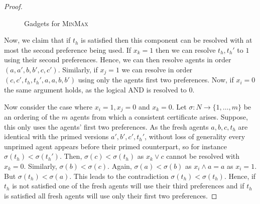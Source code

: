 \documentclass[11pt,a4paper, titlepage]{article}
\theoremstyle{definition}
\begin{document}
\begin{proof}
\begin{figure}
{{
    }}
    \caption{Gadgets for \textsc{MinMax}}
    \end{figure}

    Now, we claim that if $t_h$ is satisfied then this component can be resolved with at most the second preference being used. 
    If $x_k = 1$ then we can resolve $t_h, t_h'$ to $1$ using their second preferences. 
    Hence, we can then resolve agents in order $(a, a', b, b', c, c')$. 
    Similarly, if $x_j = 1$ we can resolve in order $(c, c', t_h, t_h', a, a, b, b')$ using only the agents first two preferences. 
    Now, if $x_i = 0$ the same argument holds, as the logical AND is resolved to 0. 

    Now consider the case where $x_i = 1, x_j = 0$ and $x_k = 0$. Let $\sigma \colon N \longrightarrow \{1, \ldots, m\}$ be an ordering of the $m$ agents from which a consistent certificate arises. Suppose, this only uses the agents' first two preferences.
    As the fresh agents $a, b, c, t_h$ are identical with the primed versions $a', b', c', t_h'$, without loss of generality every unprimed agent appears before their primed counterpart, so for instance $\sigma(t_h) < \sigma(t_h')$. 
    Then, $\sigma(c) < \sigma(t_h)$ as $x_k \lor c$ cannot be resolved with $x_k = 0$. 
    Similarly, $\sigma(b) < \sigma(c)$. Again, $ \sigma(a) < \sigma(b)$ as $x_i \land a = a$ as $x_i = 1$. But $\sigma(t_h) < \sigma(a)$. This leads to the contradiction $\sigma(t_h) < \sigma(t_h)$. 
    Hence, if $t_h$ is not satisfied one of the fresh agents will use their third preferences and if $t_h$ is satisfied all fresh agents will use only their first two preferences.


\end{proof}
\end{document}
